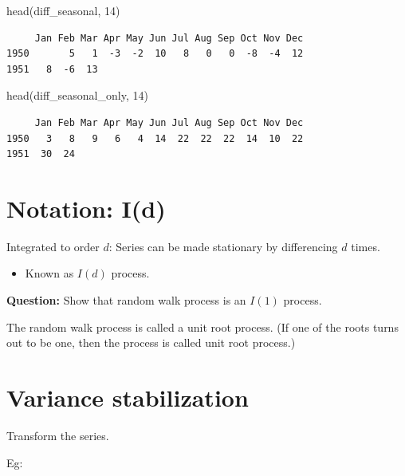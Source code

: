 \documentclass[
  11pt,
  a4paper,
]{report}
\newenvironment{Shaded}{\begin{snugshade}}{\end{snugshade}}
\newcommand{\DecValTok}[1]{\textcolor[rgb]{0.68,0.00,0.00}{#1}}
\newcommand{\FunctionTok}[1]{\textcolor[rgb]{0.28,0.35,0.67}{#1}}
\newcommand{\NormalTok}[1]{\textcolor[rgb]{0.00,0.23,0.31}{#1}}
\providecommand{\tightlist}{%
  \setlength{\itemsep}{0pt}\setlength{\parskip}{0pt}}\usepackage{longtable,booktabs,array}
\begin{document}
\begin{Shaded}
\begin{Highlighting}[]
\FunctionTok{head}\NormalTok{(diff\_seasonal, }\DecValTok{14}\NormalTok{)}
\end{Highlighting}
\end{Shaded}

\begin{verbatim}
     Jan Feb Mar Apr May Jun Jul Aug Sep Oct Nov Dec
1950       5   1  -3  -2  10   8   0   0  -8  -4  12
1951   8  -6  13                                    
\end{verbatim}

\begin{Shaded}
\begin{Highlighting}[]
\FunctionTok{head}\NormalTok{(diff\_seasonal\_only, }\DecValTok{14}\NormalTok{)}
\end{Highlighting}
\end{Shaded}

\begin{verbatim}
     Jan Feb Mar Apr May Jun Jul Aug Sep Oct Nov Dec
1950   3   8   9   6   4  14  22  22  22  14  10  22
1951  30  24                                        
\end{verbatim}

\section{Notation: I(d)}\label{notation-id}

Integrated to order \(d\): Series can be made stationary by differencing
\(d\) times.

\begin{itemize}
\tightlist
\item
  Known as \(I(d)\) process.
\end{itemize}

\textbf{Question:} Show that random walk process is an \(I(1)\) process.

The random walk process is called a unit root process. (If one of the
roots turns out to be one, then the process is called unit root
process.)

\section{Variance stabilization}\label{variance-stabilization}

Transform the series.

Eg:
\end{document}
